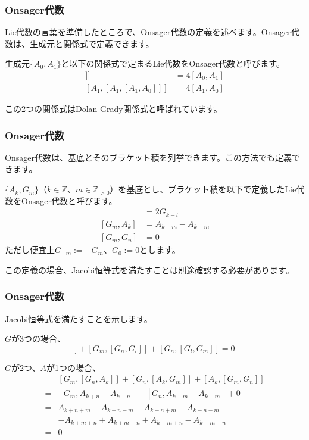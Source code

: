 \documentclass{beamer}
\begin{document}
\begin{frame}
    \frametitle{Onsager代数}

    Lie代数の言葉を準備したところで、Onsager代数の定義を述べます。Onsager代数は、生成元と関係式で定義できます。

    \begin{definition}
        生成元$\{A_0,A_1\}$と以下の関係式で定まるLie代数をOnsager代数と呼びます。
        \begin{align}
            [A_0,[A_0,[A_0,A_1]]] & =4[A_0,A_1] \\
            [A_1,[A_1,[A_1,A_0]]] & =4[A_1,A_0]
        \end{align}
    \end{definition}

    この2つの関係式はDolan-Grady関係式と呼ばれています。
\end{frame}

\begin{frame}
    \frametitle{Onsager代数}

    Onsager代数は、基底とそのブラケット積を列挙できます。この方法でも定義できます。

    \begin{definition}[Onsager代数（基底）]
        $\{A_k,G_m\}$（$k∈ℤ$、$m∈ℤ_{>0}$）を基底とし、ブラケット積を以下で定義したLie代数をOnsager代数と呼びます。
        \begin{align}
            [A_k,A_l] & =2G_{k-l}        \\
            [G_m,A_k] & =A_{k+m}-A_{k-m} \\
            [G_m,G_n] & =0
        \end{align}
        ただし便宜上$G_{-m}:=-G_m$、$G_0:=0$とします。
    \end{definition}

    この定義の場合、Jacobi恒等式を満たすことは別途確認する必要があります。
\end{frame}

\begin{frame}
    \frametitle{Onsager代数}

    Jacobi恒等式を満たすことを示します。

    \bigskip

    $G$が3つの場合、
    \begin{equation}
        [G_l,[G_m,G_n]]+[G_m,[G_n,G_l]]+[G_n,[G_l,G_m]]=0
    \end{equation}

    $G$が2つ、$A$が1つの場合、
    \begin{align}
            & [G_m,[G_n,A_k]]+[G_n,[A_k,G_m]]+[A_k,[G_m,G_n]] \\
        ={} & [G_m,A_{k+n}-A_{k-n}]-[G_n,A_{k+m}-A_{k-m}]+0   \\
        ={} & A_{k+n+m}-A_{k+n-m}-A_{k-n+m}+A_{k-n-m}         \\
            & -A_{k+m+n}+A_{k+m-n}+A_{k-m+n}-A_{k-m-n}        \\
        ={} & 0
    \end{align}
\end{frame}
\end{document}
